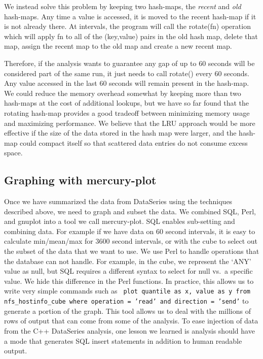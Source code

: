 We instead solve this problem by keeping two hash-maps, the {\it
recent} and {\it old} hash-maps.  Any time a value is accessed, it is
moved to the recent hash-map if it is not already there.  At intervals, 
the program will call the rotate(fn) operation which will apply
fn to all of the (key,value) pairs in the old hash map, delete that map,
assign the recent map to the old map and create a new recent map.

Therefore, if the analysis wants to guarantee any gap of up to 60
seconds will be considered part of the same run, it just needs to call
rotate() every 60 seconds.  Any value accessed in the last 60 seconds
will remain present in the hash-map.  We could reduce the memory
overhead somewhat by keeping more than two hash-maps at the cost of
additional lookups, but we have so far found that the rotating
hash-map provides a good tradeoff between minimizing memory usage and
maximizing performance.  We believe that the LRU approach would be
more effective if the size of the data stored in the hash map were
larger, and the hash-map could compact itself so that scattered
data entries do not consume excess space.

\subsection{Graphing with mercury-plot}

Once we have summarized the data from DataSeries using the techniques
described above, we need to graph and subset the data.  We combined
SQL, Perl, and gnuplot into a tool we call mercury-plot.
 SQL enables sub-setting
and combining data. For example if we have data on 60 second
intervals, it is easy to calculate min/mean/max for 3600 second
intervals, or with the cube to select out the subset of the data that
we want to use.  We use Perl to handle operations that the database
can not handle. For example, in the cube, we represent the `ANY' value
as null, but SQL requires a different syntax to select for null vs.\ a
specific value.  We hide this difference in the Perl functions.  In
practice, this allows us to write very simple commands such as {\tt
plot quantile as x, value as y from nfs\_hostinfo\_cube where
operation = 'read' and direction = 'send'} to generate a portion of
the graph.  This tool allows us to deal with the millions of rows of
output that can come from some of the analysis.  To ease injection 
of data from the C++ DataSeries analysis, one lesson we learned is
analysis should have a mode that generates SQL insert statements in
addition to human readable output.

